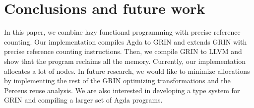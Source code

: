 \documentclass[10pt, twocolumn]{article}
\begin{document}


\section{Conclusions and future work}
In this paper, we combine lazy functional programming with precise reference counting.
Our implementation compiles Agda to GRIN and extends GRIN with precise reference counting instructions. 
Then, we compile GRIN to LLVM and show that the program reclaims all the memory.
Currently, our implementation allocates a lot of nodes. 
In future research, we would like to minimize allocations by implementing the rest of the GRIN optimizing transformations and the Perceus reuse analysis.
We are also interested in developing a type system for GRIN and compiling a larger set of Agda programs.
\end{document}
